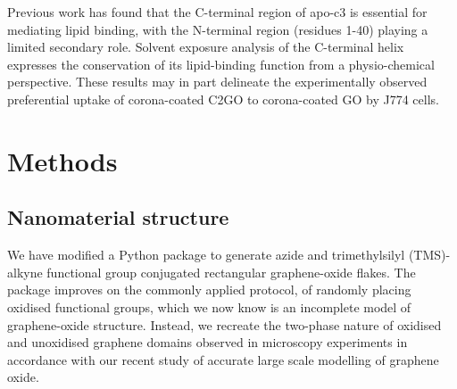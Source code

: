 Previous work has found that the C-terminal region of apo-c3 is essential for mediating lipid binding, with the N-terminal region (residues 1-40) playing a limited secondary role.\cite{sparrow1977lipid, meyers2017aromatic, lambert1996effect} Solvent exposure analysis of the C-terminal helix expresses the conservation of its lipid-binding function from a physio-chemical perspective. These results may in part delineate the experimentally observed preferential uptake of corona-coated C2GO to corona-coated GO by J774 cells.\cite{mei2018protein} 
\section{Methods}
\subsection{Nanomaterial structure}
%
We have modified a Python package \cite{make-graphitics-github} to generate azide and trimethylsilyl (TMS)-alkyne functional group conjugated rectangular graphene-oxide flakes.\cite{albadri2020accurate-github} The package improves on the commonly applied protocol, of randomly placing oxidised functional groups, which we now know is an incomplete model of graphene-oxide structure.\cite{al2020accurate, mouhat2020structure} Instead, we recreate the two-phase nature of oxidised and unoxidised graphene domains observed in microscopy experiments \cite{Pacile2011, Cai2008, Saxena2010, Erickson2010} in accordance with our recent study of accurate large scale modelling of graphene oxide.\cite{al2020accurate}

